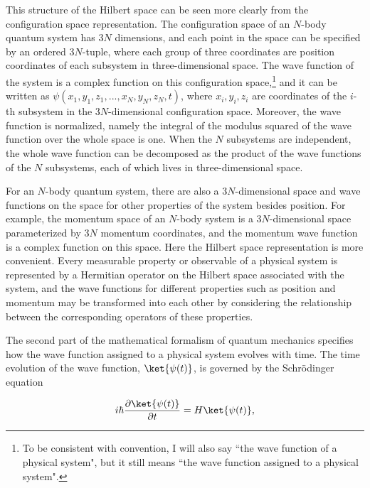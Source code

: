 This structure of the Hilbert space can be seen more clearly from the configuration space representation. The configuration space of an $N$-body quantum system has $3N$ dimensions, and each point in the space can be specified by an ordered $3N$-tuple, where each group of three coordinates are position coordinates of each subsystem in three-dimensional space. The wave function of the system is a complex function on this configuration space,\footnote{To be consistent with convention, I will also say ``the wave function of a physical system", but it still means ``the wave function assigned to a physical system".} and it can be written as $\psi(x_1,y_1,z_1,..., x_N,y_N,z_N,t)$, where $x_i,y_i, z_i$ are coordinates of the $i$-th subsystem in the $3N$-dimensional configuration space. Moreover, the wave function is normalized, namely the integral of the modulus squared of the wave function over the whole space is one. When the $N$ subsystems are independent, the whole wave function can be decomposed as the product of the wave functions of the $N$ subsystems, each of which lives in three-dimensional space.

For an $N$-body quantum system, there are also a $3N$-dimensional space and wave functions on the space for other properties of the system besides position. For example, the momentum space of an $N$-body system is a $3N$-dimensional space parameterized by $3N$ momentum coordinates, and the momentum wave function is a complex function on this space. Here the Hilbert space representation is more convenient. Every measurable property or observable of a physical system is represented by a Hermitian operator on the Hilbert space associated with the system, and the wave functions for different properties such as position and momentum may be transformed into each other by considering the relationship between the corresponding operators of these properties.

The second part of the mathematical formalism of quantum mechanics specifies how the wave function assigned to a physical system evolves with time. The time evolution of the wave function, $\ket{\psi(t)}$, is governed by the Schr\"{o}dinger equation

\begin{equation}
i \hbar {\partial \ket{\psi(t)} \over  \partial t}=H \ket{\psi(t)}, 
\end{equation}

